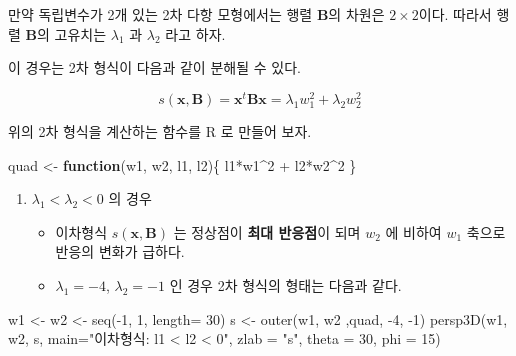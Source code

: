 \documentclass[
]{book}
\newenvironment{Shaded}{\begin{snugshade}}{\end{snugshade}}
\newcommand{\AttributeTok}[1]{\textcolor[rgb]{0.77,0.63,0.00}{#1}}
\newcommand{\ControlFlowTok}[1]{\textcolor[rgb]{0.13,0.29,0.53}{\textbf{#1}}}
\newcommand{\DecValTok}[1]{\textcolor[rgb]{0.00,0.00,0.81}{#1}}
\newcommand{\FunctionTok}[1]{\textcolor[rgb]{0.00,0.00,0.00}{#1}}
\newcommand{\NormalTok}[1]{#1}
\newcommand{\OtherTok}[1]{\textcolor[rgb]{0.56,0.35,0.01}{#1}}
\newcommand{\SpecialCharTok}[1]{\textcolor[rgb]{0.00,0.00,0.00}{#1}}
\newcommand{\StringTok}[1]{\textcolor[rgb]{0.31,0.60,0.02}{#1}}
\newcommand{\bm}[1]{\boldsymbol{\mathbf{#1}}}
\theoremstyle{definition}
\theoremstyle{definition}
\theoremstyle{definition}
\theoremstyle{definition}
\theoremstyle{remark}
\begin{document}
만약 독립변수가 2개 있는 2차 다항 모형에서는 행렬 \(\bm B\)의 차원은 \(2 \times 2\)이다.
따라서 행렬 \(\bm B\)의 고유치는 \(\lambda_1\) 과 \(\lambda_2\) 라고 하자.

이 경우는 2차 형식이 다음과 같이 분해될 수 있다.

\[ s(\bm x, \bm B) =  \bm x^t \bm B \bm x = \lambda_1 w_1^2 + \lambda_2 w_2^2 \]

위의 2차 형식을 계산하는 함수를 R 로 만들어 보자.

\begin{Shaded}
\begin{Highlighting}[]
\NormalTok{quad }\OtherTok{\textless{}{-}} \ControlFlowTok{function}\NormalTok{(w1, w2, l1, l2)\{}
\NormalTok{  l1}\SpecialCharTok{*}\NormalTok{w1}\SpecialCharTok{\^{}}\DecValTok{2} \SpecialCharTok{+}\NormalTok{ l2}\SpecialCharTok{*}\NormalTok{w2}\SpecialCharTok{\^{}}\DecValTok{2}
\NormalTok{\}}
\end{Highlighting}
\end{Shaded}

\begin{enumerate}
\def\labelenumi{\arabic{enumi}.}
\item
  \(\lambda_1 < \lambda_2 < 0\) 의 경우

  \begin{itemize}
  \item
    이차형식 \(s(\bm x, \bm B)\) 는 정상점이 \textbf{최대 반응점}이 되며 \(w_2\) 에 비하여 \(w_1\) 축으로 반응의 변화가 급하다.
  \item
    \(\lambda_1 =-4\), \(\lambda_2 =-1\) 인 경우 2차 형식의 형태는 다음과 같다.
  \end{itemize}
\end{enumerate}

\begin{Shaded}
\begin{Highlighting}[]
\NormalTok{w1 }\OtherTok{\textless{}{-}}\NormalTok{ w2 }\OtherTok{\textless{}{-}} \FunctionTok{seq}\NormalTok{(}\SpecialCharTok{{-}}\DecValTok{1}\NormalTok{, }\DecValTok{1}\NormalTok{, }\AttributeTok{length=} \DecValTok{30}\NormalTok{)}
\NormalTok{s }\OtherTok{\textless{}{-}} \FunctionTok{outer}\NormalTok{(w1, w2 ,quad, }\SpecialCharTok{{-}}\DecValTok{4}\NormalTok{, }\SpecialCharTok{{-}}\DecValTok{1}\NormalTok{)}
\FunctionTok{persp3D}\NormalTok{(w1, w2, s,}
      \AttributeTok{main=}\StringTok{"이차형식: l1 \textless{} l2 \textless{} 0"}\NormalTok{,}
      \AttributeTok{zlab =} \StringTok{"s"}\NormalTok{,}
      \AttributeTok{theta =} \DecValTok{30}\NormalTok{, }\AttributeTok{phi =} \DecValTok{15}\NormalTok{)}
\end{Highlighting}
\end{Shaded}
\end{document}
